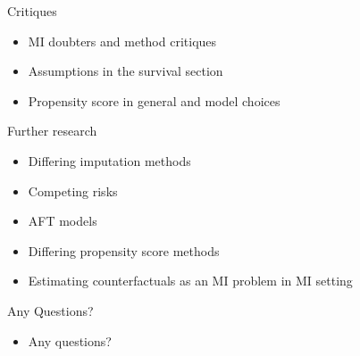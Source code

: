 \begin{frame}{Critiques}
 \begin{itemize}
  \item MI doubters and method critiques
  \item Assumptions in the survival section
  \item Propensity score in general and model choices
 \end{itemize}

\end{frame}

\begin{frame}{Further research}

\begin{itemize}
 \item Differing imputation methods
 \item Competing risks
 \item AFT models
 \item Differing propensity score methods
 \item Estimating counterfactuals as an MI problem in MI setting
 
\end{itemize}

 
\end{frame}

\begin{frame}{Any Questions?}
\begin{itemize}
 \item Any questions?
\end{itemize}
\end{frame}
